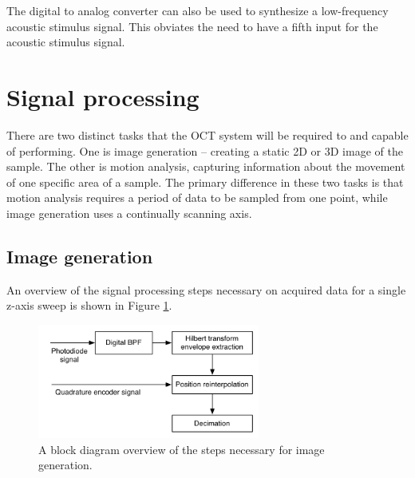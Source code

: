 The digital to analog converter can also be used to synthesize a low-frequency acoustic stimulus signal. This obviates the need to have a fifth input for the acoustic stimulus signal.


\section{Signal processing}
\label{sec:sig_proc}

There are two distinct tasks that the OCT system will be required to and capable of performing. One is image generation -- creating a static 2D or 3D image of the sample. The other is motion analysis, capturing information about the movement of one specific area of a sample. The primary difference in these two tasks is that motion analysis requires a period of data to be sampled from one point, while image generation uses a continually scanning axis.


\subsection{Image generation}

An overview of the signal processing steps necessary on acquired data for a single z-axis sweep is shown in Figure \ref{fig:imagegen}.

\begin{figure}[h!]
\centering
\includegraphics[width=0.65\textwidth]{Images/Background/image_analysis.png}
\caption{A block diagram overview of the steps necessary for image generation. \label{fig:imagegen}}
\end{figure}

